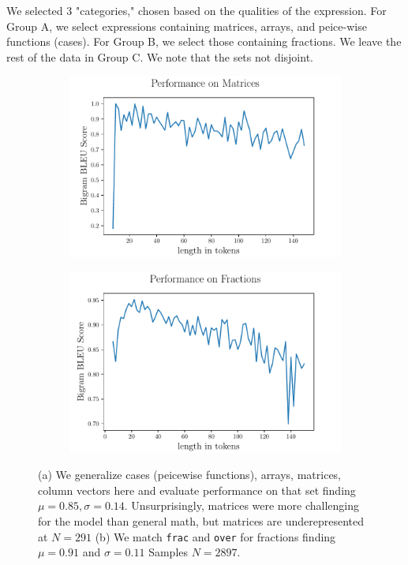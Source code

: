 \documentclass{article}
\begin{document}
We selected 3 "categories," chosen based on the qualities of the expression. For
Group A, we select expressions containing matrices, arrays, and peice-wise
functions (cases). For Group B, we select those containing fractions. We leave
the rest of the data in Group C. We note that the sets not disjoint.
\begin{figure}[h]
	\begin{subfigure}{0.5\textwidth}
    \includegraphics[scale=.425]{scorebylenstacked.pdf}
    \centering
		\caption{}
	\end{subfigure}
  \begin{subfigure}{0.5\textwidth}
    \centering
		\includegraphics[scale=.425]{scorebyfrac.pdf}
		\caption{}
  \end{subfigure}
  \caption[Model]{(a) We generalize cases (peicewise functions), arrays,
  matrices, column vectors here and evaluate performance on that set finding
  $\mu = 0.85, \sigma=0.14$. Unsurprisingly, matrices were more challenging for
  the model than general math, but matrices are underepresented at $N=291$ (b)
  We match \texttt{frac} and \texttt{over} for fractions finding $\mu = 0.91$
  and $\sigma =0.11$ Samples $N = 2897$.}
\end{figure}
\end{document}
